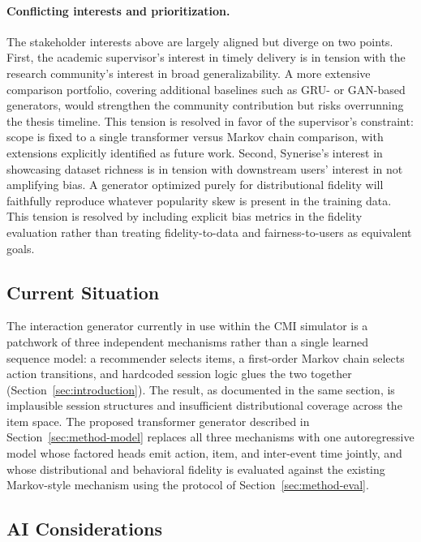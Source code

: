 \documentclass[sigconf,nonacm]{acmart}
\begin{document}
\paragraph{Conflicting interests and prioritization.}
The stakeholder interests above are largely aligned but diverge on two
points. First, the academic supervisor's interest in timely delivery is in
tension with the research community's interest in broad generalizability. A
more extensive comparison portfolio, covering additional baselines such as
GRU- or GAN-based generators, would strengthen the community contribution
but risks overrunning the thesis timeline. This tension is resolved in
favor of the supervisor's constraint: scope is fixed to a single transformer
versus Markov chain comparison, with extensions explicitly identified as
future work. Second, Synerise's interest in showcasing dataset richness is
in tension with downstream users' interest in not amplifying bias. A
generator optimized purely for distributional fidelity will faithfully
reproduce whatever popularity skew is present in the training data. This
tension is resolved by including explicit bias metrics in the fidelity
evaluation rather than treating fidelity-to-data and fairness-to-users as
equivalent goals.

\subsection{Current Situation}
\label{sec:current-situation}
The interaction generator currently in use within the CMI simulator is a
patchwork of three independent mechanisms rather than a single learned
sequence model: a recommender selects items, a first-order Markov chain
selects action transitions, and hardcoded session logic glues the two
together (Section~\ref{sec:introduction}). The result, as documented in
the same section, is implausible session structures and insufficient
distributional coverage across the item space. The proposed transformer
generator described in Section~\ref{sec:method-model} replaces all
three mechanisms with one autoregressive model whose factored heads
emit action, item, and inter-event time jointly, and whose
distributional and behavioral fidelity is evaluated against the
existing Markov-style mechanism using the protocol of
Section~\ref{sec:method-eval}.

\subsection{AI Considerations}
\label{sec:ai-considerations}
\end{document}
